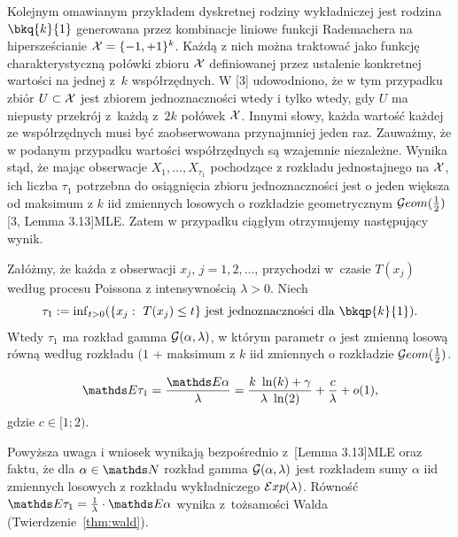 \noindent
Kolejnym omawianym przykładem dyskretnej rodziny wykładniczej jest rodzina $\bkq{k}{1}$ generowana przez kombinacje liniowe funkcji Rademachera na hipersześcianie $\mathcal{X}=\{-1,+1\}^k$. Każdą z nich można traktować jako funkcję charakterystyczną połówki zbioru $\mathcal{X}$ definiowanej przez ustalenie konkretnej wartości na jednej z~$k$ współrzędnych. W [3] udowodniono, że w tym przypadku zbiór $U\subset\mathcal{X}$ jest zbiorem jednoznaczności wtedy i tylko wtedy, gdy $U$ ma niepusty przekrój z~każdą z~$2k$ połówek $\mathcal{X}$. Innymi słowy, każda wartość każdej ze współrzędnych musi być zaobserwowana przynajmniej jeden raz. Zauważmy, że w podanym przypadku wartości współrzędnych są wzajemnie niezależne. Wynika stąd, że mając obserwacje $X_1,\ldots,X_{\tau_1}$ pochodzące z rozkładu jednostajnego na $\mathcal{X}$, ich liczba $\tau_1$ potrzebna do osiągnięcia zbioru jednoznaczności jest o jeden większa od maksimum z $k$ iid zmiennych losowych o rozkładzie geometrycznym $\mathcal{G}eom(\frac12)$ [3, Lemma 3.13]{MLE}. Zatem w przypadku ciągłym otrzymujemy następujący wynik.



\begin{remark}
Załóżmy, że każda z obserwacji $x_j$, $j=1,2,\ldots$, przychodzi w~czasie $T(x_j)$ według procesu Poissona z intensywnością $\lambda>0$. Niech 
$$
\tau_1:={\rm{inf}}_{t>0}(\{x_j:\ T(x_j)\leq t\}\ {\rm{jest\ jednoznaczno{\textrm{\'s}}ci\ dla\ }} \bkqp{k}{1}).
$$
Wtedy $\tau_1$ ma rozkład gamma $\mathcal{G}(\alpha,\lambda)$, w którym parametr $\alpha$ jest zmienną losową równą według rozkładu ($1$ + maksimum z $k$ iid zmiennych o rozkładzie $\mathcal{G}eom(\frac12)$.
\end{remark}
\begin{corollary}
\leavevmode
\makeatletter
\@nobreaktrue
\makeatother
$$
\EE \tau_1 = \frac{\EE\alpha}{\lambda} = \frac{k\ \ln(k) + \gamma}{\lambda\ \ln(2)} + \frac{c}{\lambda} + o(1),
$$
gdzie $c\in[1;2)$.
\end{corollary}
\noindent
Powyższa uwaga i wniosek wynikają bezpośrednio z~[Lemma 3.13]{MLE} oraz faktu, że dla $\alpha\in\N$ rozkład gamma $\mathcal{G}(\alpha,\lambda)$ jest rozkładem sumy $\alpha$ iid zmiennych losowych z rozkładu wykładniczego $\mathcal{E}xp(\lambda)$. Równość $\EE\tau_1 = \frac{1}{\lambda} \cdot \EE\alpha$ wynika z~tożsamości Walda (Twierdzenie~\ref{thm:wald}).


